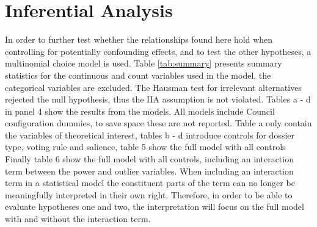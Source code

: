 \section{Inferential Analysis}

In order to further test whether the relationships found here hold when controlling for potentially confounding effects, and to test the other hypotheses, a multinomial choice model is used. Table \ref{tab:summary} presents summary statistics for the continuous and count variables used in the model, the categorical variables are excluded. The Hausman test for irrelevant alternatives rejected the null hypothesis, thus the IIA assumption is not violated. Tables a - d in panel 4 show the results from the models. All models include Council configuration dummies, to save space these are not reported. Table a only contain the variables of theoretical interest, tables b - d introduce controls for dossier type, voting rule and salience, table 5 show the full model with all controls Finally table 6 show the full model with all controls, including an interaction term between the power and outlier variables. When including an interaction term in a statistical model the constituent parts of the term can no longer be meaningfully interpreted in their own right. Therefore, in order to be able to evaluate hypotheses one and two, the interpretation will focus on the full model with and without the interaction term.

